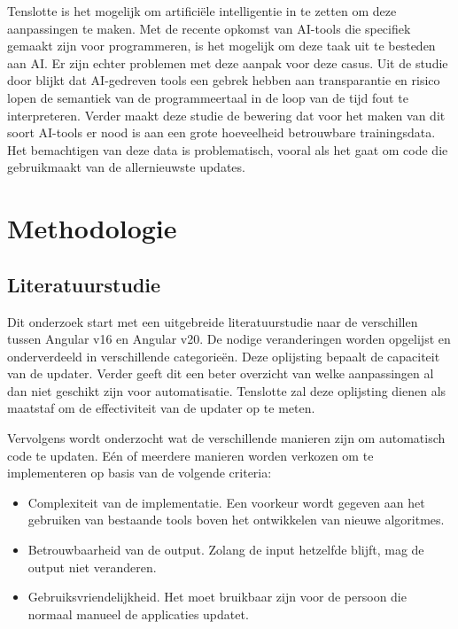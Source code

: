 Tenslotte is het mogelijk om artificiële intelligentie in te zetten om deze aanpassingen te maken.
Met de recente opkomst van AI-tools die specifiek gemaakt zijn voor programmeren, is het mogelijk om deze taak uit te besteden aan AI.
Er zijn echter problemen met deze aanpak voor deze casus.
Uit de studie door \textcite{Hodovychenko2025} blijkt dat AI-gedreven tools een gebrek hebben aan transparantie en risico lopen de semantiek van de programmeertaal in de loop van de tijd fout te interpreteren.
Verder maakt deze studie de bewering dat voor het maken van dit soort AI-tools er nood is aan een grote hoeveelheid betrouwbare trainingsdata.
Het bemachtigen van deze data is problematisch, vooral als het gaat om code die gebruikmaakt van de allernieuwste updates.

\section{Methodologie}
\label{sec:methodologie}

\subsection{Literatuurstudie}
\label{sec:methodologie:literatuurstudie}

Dit onderzoek start met een uitgebreide literatuurstudie naar de verschillen tussen Angular v16 en Angular v20.
De nodige veranderingen worden opgelijst en onderverdeeld in verschillende categorieën.
Deze oplijsting bepaalt de capaciteit van de updater.
Verder geeft dit een beter overzicht van welke aanpassingen al dan niet geschikt zijn voor automatisatie.
Tenslotte zal deze oplijsting dienen als maatstaf om de effectiviteit van de updater op te meten.

Vervolgens wordt onderzocht wat de verschillende manieren zijn om automatisch code te updaten.
Eén of meerdere manieren worden verkozen om te implementeren op basis van de volgende criteria:
\begin{itemize}
  \item Complexiteit van de implementatie. Een voorkeur wordt gegeven aan het gebruiken van bestaande tools boven het ontwikkelen van nieuwe algoritmes.
  \item Betrouwbaarheid van de output. Zolang de input hetzelfde blijft, mag de output niet veranderen.
  \item Gebruiksvriendelijkheid. Het moet bruikbaar zijn voor de persoon die normaal manueel de applicaties updatet.
\end{itemize}

